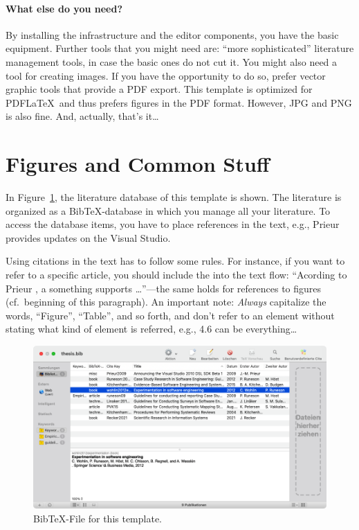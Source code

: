 \paragraph*{What else do you need?}
By installing the infrastructure and the editor components, you have the basic equipment. Further tools that you might need are: ``more sophisticated'' literature management tools, in case the basic ones do not cut it. You might also need a tool for creating images. If you have the opportunity to do so, prefer vector graphic tools that provide a PDF export. This template is optimized for PDF\LaTeX\ and thus prefers figures in the PDF format. However, JPG and PNG is also fine. And, actually, that's it\ldots

\section{Figures and Common Stuff}
\label{sec:1:BilderUndSo}
In Figure~\ref{fig:bibtex}, the literature database of this template is shown. The literature is organized as a BibTeX-database in which you manage all your literature. To access the database items, you have to place references in the text, e.g., Prieur \cite{Prieur2009} provides updates on the Visual Studio. 

Using citations in the text has to follow some rules. For instance, if you want to refer to a specific article, you should include the into the text flow: ``Acording to Prieur \cite{Prieur2009}, a something supports \ldots''---the same holds for references to figures (cf.\ beginning of this paragraph). An important note: \emph{Always} capitalize the words, ``Figure'', ``Table'', and so forth, and don't refer to an element without stating what kind of element is referred, e.g., 4.6 can be everything\ldots
\begin{figure}[htbp]
	\includegraphics[width=1.00\textwidth]{figs/bibtex.png}
	\caption{BibTeX-File for this template.}
	\label{fig:bibtex}
\end{figure}

